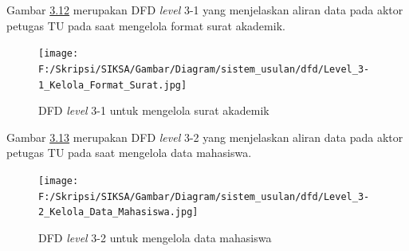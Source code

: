 Gambar \hyperlink{level_3-1}{3.12} merupakan DFD \textit{level} 3-1 yang menjelaskan aliran data pada aktor petugas TU pada saat mengelola format surat akademik.

\begin{figure}[H]
	\centering
		\texttt{[image: F:/Skripsi/SIKSA/Gambar/Diagram/sistem\_usulan/dfd/Level\_3-1\_Kelola\_Format\_Surat.jpg]}
	\caption{DFD \textit{level} 3-1 untuk mengelola surat akademik}
	\label{fig:level_3-1}
\end{figure}

Gambar \hyperlink{level_3-2}{3.13} merupakan DFD \textit{level} 3-2 yang menjelaskan aliran data pada aktor petugas TU pada saat mengelola data mahasiswa.

\begin{figure}[H]
	\centering
		\texttt{[image: F:/Skripsi/SIKSA/Gambar/Diagram/sistem\_usulan/dfd/Level\_3-2\_Kelola\_Data\_Mahasiswa.jpg]}
	\caption{DFD \textit{level} 3-2 untuk mengelola data mahasiswa}
	\label{fig:level_3-2}
\end{figure}

